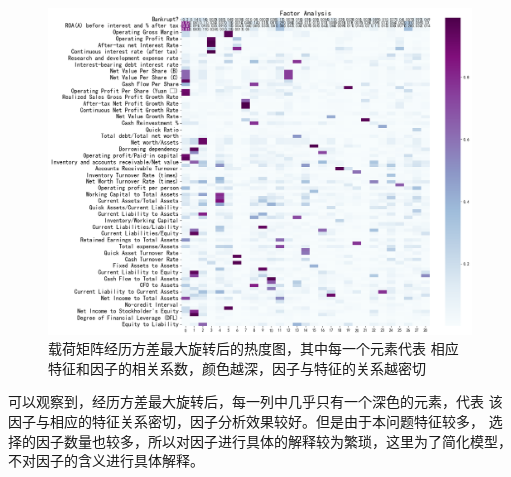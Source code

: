 \begin{figure}[ht]
    \centering
    \includegraphics[width=.7\textwidth]{images/factor_analysis_varimax.png}
    \caption{载荷矩阵经历方差最大旋转后的热度图，其中每一个元素代表
    相应特征和因子的相关系数，颜色越深，因子与特征的关系越密切}
    \label{fig:after-varimax-rotation}
\end{figure}
可以观察到，经历方差最大旋转后，每一列中几乎只有一个深色的元素，代表
该因子与相应的特征关系密切，因子分析效果较好。但是由于本问题特征较多，
选择的因子数量也较多，所以对因子进行具体的解释较为繁琐，这里为了简化模型，
不对因子的含义进行具体解释。

